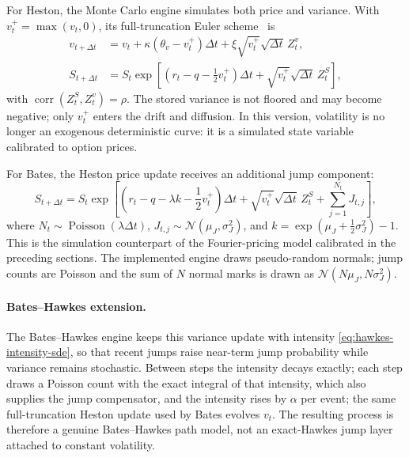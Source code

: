 For Heston, the Monte Carlo engine simulates both price and variance. With \(v_t^+=\max(v_t,0)\), its full-truncation Euler scheme~\cite{LordKoekkoekVanDijk2010} is
\begin{align}
    v_{t+\Delta t}
    &=
    v_t + \kappa(\theta_v-v_t^+)\Delta t
    + \xi\sqrt{v_t^+}\sqrt{\Delta t}\,Z_t^v,\\
    S_{t+\Delta t}
    &=
    S_t
    \exp\left[
        \left(r_t-q-\frac{1}{2}v_t^+\right)\Delta t
        + \sqrt{v_t^+}\sqrt{\Delta t}\,Z_t^S
    \right],
\end{align}
with \(\operatorname{corr}(Z_t^S,Z_t^v)=\rho\). The stored variance is not floored and may become negative; only \(v_t^+\) enters the drift and diffusion. In this version, volatility is no longer an exogenous deterministic curve: it is a simulated state variable calibrated to option prices.

For Bates, the Heston price update receives an additional jump component:
\begin{equation}
    S_{t+\Delta t}
    =
    S_t
    \exp\left[
        \left(r_t-q-\lambda k-\frac{1}{2}v_t^+\right)\Delta t
        + \sqrt{v_t^+}\sqrt{\Delta t}\,Z_t^S
        + \sum_{j=1}^{N_t} J_{t,j}
    \right],
\end{equation}
where \(N_t\sim\operatorname{Poisson}(\lambda\Delta t)\), \(J_{t,j}\sim\mathcal{N}(\mu_J,\sigma_J^2)\), and \(k=\exp(\mu_J+\frac{1}{2}\sigma_J^2)-1\). This is the simulation counterpart of the Fourier-pricing model calibrated in the preceding sections. The implemented engine draws pseudo-random normals; jump counts are Poisson and the sum of \(N\) normal marks is drawn as \(\mathcal N(N\mu_J,N\sigma_J^2)\).

\paragraph{Bates--Hawkes extension.}
The Bates--Hawkes engine keeps this variance update with intensity \eqref{eq:hawkes-intensity-sde}, so that recent jumps raise near-term jump probability while variance remains stochastic. Between steps the intensity decays exactly; each step draws a Poisson count with the exact integral of that intensity, which also supplies the jump compensator, and the intensity rises by \(\alpha\) per event; the same full-truncation Heston update used by Bates evolves \(v_t\). The resulting process is therefore a genuine Bates--Hawkes path model, not an exact-Hawkes jump layer attached to constant volatility.

